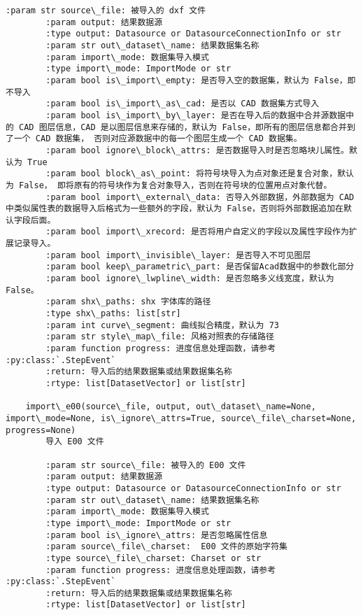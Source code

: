 \documentclass[11pt]{article}
\begin{document}
\begin{Verbatim}[commandchars=\\\{\}]
        :param str source\_file: 被导入的 dxf 文件
        :param output: 结果数据源
        :type output: Datasource or DatasourceConnectionInfo or str
        :param str out\_dataset\_name: 结果数据集名称
        :param import\_mode: 数据集导入模式
        :type import\_mode: ImportMode or str
        :param bool is\_import\_empty: 是否导入空的数据集，默认为 False，即不导入
        :param bool is\_import\_as\_cad: 是否以 CAD 数据集方式导入
        :param bool is\_import\_by\_layer: 是否在导入后的数据中合并源数据中的 CAD 图层信息，CAD 是以图层信息来存储的，默认为 False，即所有的图层信息都合并到了一个 CAD 数据集， 否则对应源数据中的每一个图层生成一个 CAD 数据集。
        :param bool ignore\_block\_attrs: 是否数据导入时是否忽略块儿属性。默认为 True
        :param bool block\_as\_point: 将符号块导入为点对象还是复合对象，默认为 False， 即将原有的符号块作为复合对象导入，否则在符号块的位置用点对象代替。
        :param bool import\_external\_data: 否导入外部数据，外部数据为 CAD 中类似属性表的数据导入后格式为一些额外的字段，默认为 False，否则将外部数据追加在默认字段后面。
        :param bool import\_xrecord: 是否将用户自定义的字段以及属性字段作为扩展记录导入。
        :param bool import\_invisible\_layer: 是否导入不可见图层
        :param bool keep\_parametric\_part: 是否保留Acad数据中的参数化部分
        :param bool ignore\_lwpline\_width: 是否忽略多义线宽度，默认为 False。
        :param shx\_paths: shx 字体库的路径
        :type shx\_paths: list[str]
        :param int curve\_segment: 曲线拟合精度，默认为 73
        :param str style\_map\_file: 风格对照表的存储路径
        :param function progress: 进度信息处理函数，请参考 :py:class:`.StepEvent`
        :return: 导入后的结果数据集或结果数据集名称
        :rtype: list[DatasetVector] or list[str]
    
    import\_e00(source\_file, output, out\_dataset\_name=None, import\_mode=None, is\_ignore\_attrs=True, source\_file\_charset=None, progress=None)
        导入 E00 文件
        
        :param str source\_file: 被导入的 E00 文件
        :param output: 结果数据源
        :type output: Datasource or DatasourceConnectionInfo or str
        :param str out\_dataset\_name: 结果数据集名称
        :param import\_mode: 数据集导入模式
        :type import\_mode: ImportMode or str
        :param bool is\_ignore\_attrs: 是否忽略属性信息
        :param source\_file\_charset:  E00 文件的原始字符集
        :type source\_file\_charset: Charset or str
        :param function progress: 进度信息处理函数，请参考 :py:class:`.StepEvent`
        :return: 导入后的结果数据集或结果数据集名称
        :rtype: list[DatasetVector] or list[str]
    

\end{Verbatim}
\end{document}
